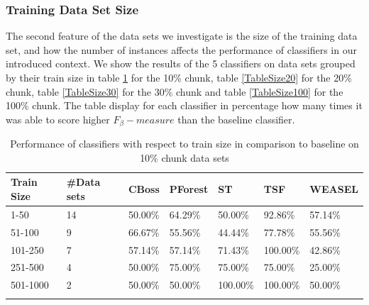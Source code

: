 

\subsubsection{Training Data Set Size}
The second feature of the data sets we investigate is the size of the training data set, and how the number of instances affects the performance of classifiers in our introduced context.
We show the results of the 5 classifiers on data sets grouped by their train size in table \ref{TableSize10} for the 10\% chunk, table \ref{TableSize20} for the 20\% chunk, table \ref{TableSize30} for the 30\% chunk and table \ref{TableSize100} for the 100\% chunk.
The table display for each classifier in percentage how many times it was able to score higher $F_{\beta}-measure$ than the baseline classifier.

\begin{table}[hp!]
	\setlength\extrarowheight{2pt} %
	\begin{tabularx}{\textwidth}{|X|X|X|X|X|X|X|}
	\hline
	\textbf{Train Size} & \textbf{\#Data sets} & \textbf{CBoss} & \textbf{PForest} & \textbf{ST} & \textbf{TSF} & \textbf{WEASEL} \\ \hline
		1-50 & 14 & 50.00\% & 64.29\% & 50.00\% & 92.86\% & 57.14\% \\ \hline
		51-100 & 9 & 66.67\% & 55.56\% & 44.44\% & 77.78\% & 55.56\% \\ \hline
		101-250 & 7 & 57.14\% & 57.14\% & 71.43\% & 100.00\% & 42.86\% \\ \hline
		251-500 & 4 & 50.00\% & 75.00\% & 75.00\% & 75.00\% & 25.00\% \\ \hline
		501-1000 & 2 &50.00\% & 50.00\% & 100.00\% & 100.00\% & 50.00\% \\ \hline
	\caption{Performance of classifiers with respect to train size in comparison to baseline on 10\% chunk data sets}
	\label{TableSize10}
  \end{tabularx}
\end{table}

